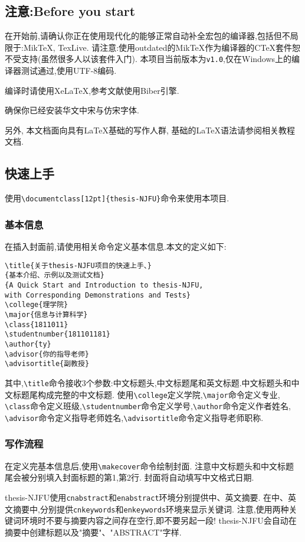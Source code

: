 \documentclass[12pt]{thesis-NJFU}
\begin{document}
\subsection{注意:Before you start}
在开始前,请确认你正在使用现代化的能够正常自动补全宏包的编译器,包括但不局限于:MikTeX, TexLive.
请注意:使用outdated的MikTeX作为编译器的CTeX套件恕不受支持(虽然很多人以该套件入门).
本项目当前版本为\verb|v1.0|,仅在Windows上的编译器测试通过,使用UTF-8编码.

编译时请使用XeLaTeX,参考文献使用Biber引擎.

确保你已经安装华文中宋与仿宋字体.

另外, 本文档面向具有\LaTeX 基础的写作人群, 基础的\LaTeX 语法请参阅相关教程文档.

\subsection{快速上手}

使用\verb|\documentclass[12pt]{thesis-NJFU}|命令来使用本项目.

\subsubsection{基本信息}
在插入封面前,请使用相关命令定义基本信息.本文的定义如下:
\begin{verbatim}
\title{关于thesis-NJFU项目的快速上手、}
{基本介绍、示例以及测试文档}
{A Quick Start and Introduction to thesis-NJFU, 
with Corresponding Demonstrations and Tests}
\college{理学院}
\major{信息与计算科学}
\class{1811011}
\studentnumber{181101181}
\author{ty}
\advisor{你的指导老师}
\advisortitle{副教授}
\end{verbatim}
其中,\verb|\title|命令接收3个参数:中文标题头,中文标题尾和英文标题.中文标题头和中文标题尾构成完整的中文标题.
使用\verb|\college|定义学院,\verb|\major|命令定义专业,
\verb|\class|命令定义班级,\verb|\studentnumber|命令定义学号,\verb|\author|命令定义作者姓名,
\verb|\advisor|命令定义指导老师姓名,\verb|\advisortitle|命令定义指导老师职称.

\subsubsection{写作流程}
在定义完基本信息后,使用\verb|\makecover|命令绘制封面.
注意中文标题头和中文标题尾会被分别填入封面标题的第1,第2行.
封面将自动填写中文格式日期.

thesis-NJFU使用\verb|cnabstract|和\verb|enabstract|环境分别提供中、英文摘要.
在中、英文摘要中,分别提供\verb|cnkeywords|和\verb|enkeywords|环境来显示关键词.
注意,使用两种关键词环境时不要与摘要内容之间存在空行,即不要另起一段!
thesis-NJFU会自动在摘要中创建标题以及"摘要"、"ABSTRACT"字样.
\end{document}
